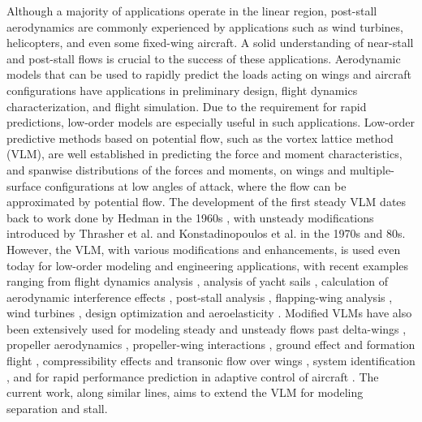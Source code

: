 Although a majority of applications operate in the linear region, post-stall aerodynamics are commonly experienced by applications such as wind turbines, helicopters, and even some fixed-wing aircraft. A solid understanding of near-stall and post-stall flows is crucial to the success of these applications.
Aerodynamic models that can be used to rapidly predict the loads acting on wings and aircraft configurations have applications in preliminary design, flight dynamics characterization, and flight simulation.
Due to the requirement for rapid predictions, low-order models are especially useful in such applications.
Low-order predictive methods based on potential flow, such as the vortex lattice method (VLM), are well established in predicting the force and moment characteristics, and spanwise distributions of the forces and moments, on wings and multiple-surface configurations at low angles of attack, where the flow can be approximated by potential flow.
The development of the first steady VLM dates back to work done by Hedman in the 1960s
\cite{Hedman_VLM_1965}, with unsteady modifications introduced by Thrasher et al. \cite{Thrasher1977} and Konstadinopoulos et al. \cite{Konstadinopoulos1985} in the 1970s and 80s.
However, the VLM, with various modifications
and enhancements, is used even today for low-order modeling and
engineering applications, with recent examples ranging from flight
dynamics analysis \cite{drela_avl, Obradvoic_Subbarao_2011}, analysis of
yacht sails \cite{FIDDES199635}, calculation of aerodynamic
interference effects \cite{Elzebda_Mook_Nayfeh_1994, Rossow_1995,
Karkehabadi_2004}, post-stall analysis \cite{Mukherjee_poststall_2006,
Rom1993}, flapping-wing analysis
\cite{Nguyen_insect_UVLM_2016, Fritz_Long_2004, Stanford_Beran_2010,Hirato2019},
wind turbines \cite{SIMOES1992129, PESMAJOGLOU20001}, design
optimization \cite{CUSHER201435, Stanford_Beran_2010, Mariens2014} and
aeroelasticity \cite{MURUA201246, Palacios_Murua_Cook_2010,
Murua_Palacios_Graham_2012}.
Modified VLMs have also been extensively used for modeling steady and unsteady flows past delta-wings \cite{Traub1999},
propeller aerodynamics \cite{Kobayakawa1985},
propeller-wing interactions \cite{Witkowski1989},
ground effect and formation flight \cite{Frazier2003, King2005,Han2005,Zhang2017},
compressibility effects and transonic flow over wings \cite{Batina1986,Melin2010},
system identification \cite{Venkataraman2019},
and for rapid performance prediction in adaptive control of aircraft \cite{Kim2010,Menon2013}.
The current work, along similar lines, aims to extend the VLM for modeling separation and stall.

